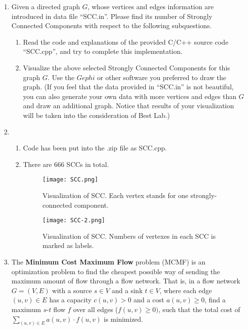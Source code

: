 \documentclass[12pt,a4paper]{article}
\makeatletter
\newtheorem*{solution}{Solution}
\theoremstyle{definition}
\renewenvironment{solution}[1][Solution] {\par\pushQED{\qed}\normalfont\topsep6\p@\@plus6\p@\relax\trivlist\item[\hskip\labelsep\bfseries#1\@addpunct{.}]\ignorespaces}{\popQED\endtrivlist\@endpefalse} \makeatother
\makeatother
\begin{document}
\begin{enumerate}
	\item Given a directed graph $G$, whose vertices and edges information are introduced in data file ``SCC.in''. Please find its number of Strongly Connected Components with respect to the following subquestions.
    \begin{enumerate}
    	\item Read the code and explanations of the provided C/C++ source code ``SCC.cpp'', and try to complete this implementation.
    	\item Visualize the above selected Strongly Connected Components for this graph $G$. Use the $Gephi$ or other software you preferred to draw the graph. {\color{blue}(If you feel that the data provided in ``SCC.in'' is not beautiful, you can also generate your own data with more vertices and edges than $G$ and draw an additional graph. Notice that results of your visualization will be taken into the consideration of Best Lab.)}

    \end{enumerate}
    \begin{solution}
    	\begin{enumerate}
    	
    	\item 
            Code has been put into the .zip file as SCC.cpp.
        \item 
            There are 666 SCCs in total.
        \begin{figure}[htbp]
        	
        	\centering
        	\texttt{[image: SCC.png]}
        	\caption{Visualization of SCC. Each vertex stands for one strongly-connected component.}
        	\label{SCC}
        \end{figure}
        \begin{figure}[htbp]
        	
        	\centering
        	\texttt{[image: SCC-2.png]}
        	\caption{Visualization of SCC. Numbers of vertexes in each SCC is marked as labels.}
        	\label{SCC-2}
        \end{figure}
    \end{enumerate}
    \end{solution}
	\item The \textbf{Minimum Cost Maximum Flow} problem (MCMF) is an optimization problem to find the cheapest possible way of sending the maximum amount of flow through a flow network. That is, in a flow network $G = (V, E)$ with a source $s\in V$ and a sink $t\in V$, where each edge $(u, v)\in E$ has a capacity $c(u,v) > 0$ and a cost $a(u,v) \ge 0$, find a maximum $s\text{-}t$ flow $f$ over all edges ($f(u, v) \ge 0)$, such that the total cost of $\sum_{(u, v) \in E} a(u, v) \cdot f(u, v)$ is minimized.


\end{enumerate}
\end{document}
